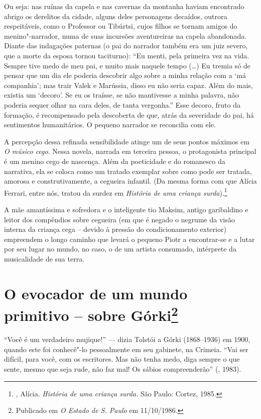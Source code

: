 Ou seja: nas ruínas da capela e nas cavernas da montanha haviam
encontrado abrigo os derelitos da cidade, alguns deles personagens
decaídos, outrora respeitáveis, como o Professor ou Tibúrtsi, cujos
filhos se tornam amigos do menino"-narrador, numa de suas incursões
aventureiras na capela abandonada. Diante das indagações paternas (o pai
do narrador também era um juiz severo, que a morte da esposa tornou
taciturno): ``Eu menti, pela primeira vez na vida. Sempre tive medo de
meu pai, e muito mais naquele tempo (\ldots{}) Eu tremia só de pensar que um
dia ele poderia descobrir algo sobre a minha relação com a `má
companhia'; mas trair Valek e Marússia, disso eu não seria capaz. Além
do mais, existia um `decoro'. Se eu os traísse, se não mantivesse a
minha palavra, não poderia sequer olhar na cara deles, de tanta
vergonha.'' Esse decoro, fruto da formação, é recompensado pela
descoberta de que, atrás da severidade do pai, há sentimentos
humanitários. O pequeno narrador se reconcilia com ele.

A percepção dessa refinada sensibilidade atinge um de seus pontos
máximos em \emph{O músico cego}. Nessa novela, narrada em terceira
pessoa, o protagonista principal é um menino cego de nascença. Além
da poeticidade e do romanesco da narrativa, ela se coloca como um
tratado exemplar sobre como pode ser tratada, amorosa e construtivamente,
a cegueira infantil. (Da mesma forma com que Alícia Ferrari, entre nós,
tratou da surdez em \emph{História de uma criança
surda}).\footnote{, Alícia. \emph{História de uma
criança surda.} São Paulo: Cortez, 1985.}

A mãe amantíssima e sofredora e o inteligente tio Maksim, antigo
garibaldino e leitor dos compêndios sobre cegueira (em que é negado
o negrume da visão interna da criança cega -- devido à pressão do
condicionamento exterior) empreendem o longo caminho que levará o
pequeno Piotr a encontrar-se e a lutar por seu lugar no mundo, no
caso, o de um artista consumado, intérprete da musicalidade de sua
terra.

\chapter{O evocador de um mundo primitivo -- sobre Górki\footnote{Publicado em \emph{O Estado de S. Paulo} em 11/10/1986.}}

``Você é um verdadeiro mujique!'' --- dizia Tolstói a Górki
(1868--1936) em 1900, quando este foi conhecê"-lo pessoalmente em
seu gabinete, na Crimeia. ``Vai ser difícil, para você, com os
escritores. Mas não tenha medo, diga sempre o que sente, mesmo
que seja rude, não faz mal! Os sábios compreenderão'' (, 1983).

